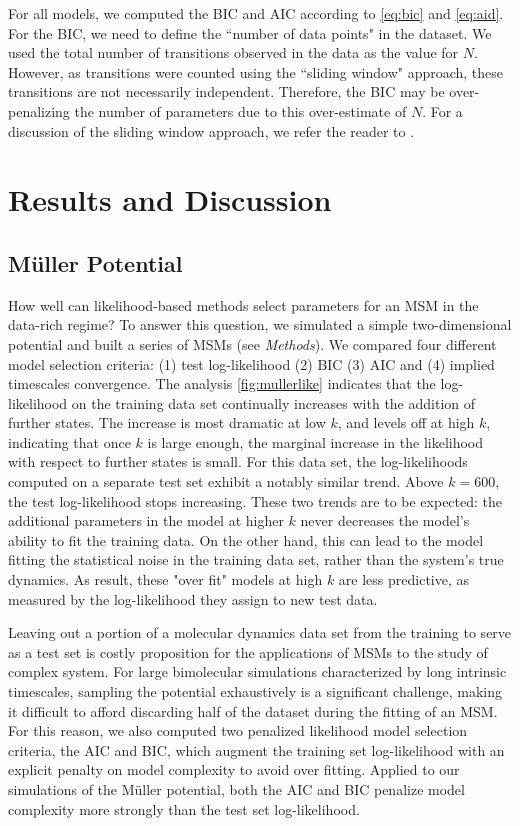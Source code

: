 \documentclass[journal=jpcbfk, layout=traditional, manuscript=article]{achemso}
\begin{document}
For all models, we computed the BIC and AIC according to \cref{eq:bic} and \cref{eq:aid}. For the BIC, we need to define the ``number of data points" in the dataset. We used the total number of transitions observed in the data as the value for $N$. However, as transitions were counted using the ``sliding window" approach, these transitions are not necessarily independent. Therefore, the BIC may be over-penalizing the number of parameters due to this over-estimate of $N$. For a discussion of the sliding window approach, we refer the reader to \citet{Prinz2011Markov}.

\section{Results and Discussion}
\subsection{M\"{u}ller Potential}

How well can likelihood-based methods select parameters for an MSM in the data-rich regime? To answer this question, we simulated a simple two-dimensional potential and built a series of MSMs (see \emph{Methods}). We compared four different model selection criteria: (1) test log-likelihood (2) BIC (3) AIC and (4) implied timescales convergence. The analysis \cref{fig:mullerlike} indicates that the log-likelihood on the training data set continually increases with the addition of further states. The increase is most dramatic at low $k$, and levels off at high $k$, indicating that once $k$ is large enough, the marginal increase in the likelihood with respect to further states is small. For this data set, the log-likelihoods computed on a separate test set exhibit a notably similar trend. Above $k=600$, the test log-likelihood stops increasing. These two trends are to be expected: the additional parameters in the model at higher $k$ never decreases the model's ability to fit the training data. On the other hand, this can lead to the model fitting the statistical noise in the training data set, rather than the system's true dynamics. As result, these "over fit" models at high $k$ are less predictive, as measured by the log-likelihood they assign to new test data.

Leaving out a portion of a molecular dynamics data set from the training to serve as a test set is costly proposition for the applications of MSMs to the study of complex system. For large bimolecular simulations characterized by long intrinsic timescales, sampling the potential exhaustively is a significant challenge\cite{Lane2013Milliseconds}, making it difficult to afford discarding half of the dataset during the fitting of an MSM. For this reason, we also computed two penalized likelihood model selection criteria, the AIC and BIC, which augment the training set log-likelihood with an explicit penalty on model complexity to avoid over fitting. Applied to our simulations of the M\"{u}ller potential, both the AIC and BIC penalize model complexity more strongly than the test set log-likelihood.
\end{document}
